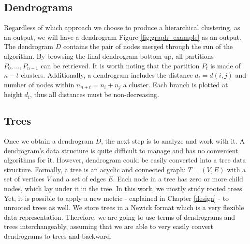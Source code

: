 \subsection{Dendrograms} 

Regardless of which approach we choose to produce a hierarchical clustering, as an output, we will have a dendrogram Figure \ref{fig:graph_example} as an output. The dendrogram $D$ contains the pair of nodes merged through the run of the algorithm. By browsing the final dendrogram bottom-up, all partitions $P_0, \dots, P_{n-1}$ can be retrieved.
It is worth noting that the partition $P_t$ is made of $n - t$ clusters. Additionally, a dendrogram includes the distance $d_t = d(i, j)$ and number of nodes within $n_{n+t} = n_i + n_j$ a cluster. Each branch is plotted at height $d_t$, thus all distances must be non-decreasing.

\subsection{Trees}
Once we obtain a dendrogram $D$, the next step is to analyze and work with it. A dendrogram's data structure is quite difficult to manage and has no convenient algorithms for it. However, dendrogram could be easily converted into a tree data structure. Formally, a tree is an acyclic and connected graph: $T=(V, E)$ with a set of vertices $V$ and a set of edges $E$. Each node in a tree has zero or more child nodes, which lay under it in the tree. In this work, we mostly study rooted trees. Yet, it is possible to apply a new metric - explained in Chapter \ref{design} - to unrooted trees as well. We store trees in a Newick format \cite{newick1990} which is a very flexible data representation. Therefore, we are going to use terms of dendrograms and trees interchangeably, assuming that we are able to very easily convert dendrograms to trees and backward. 